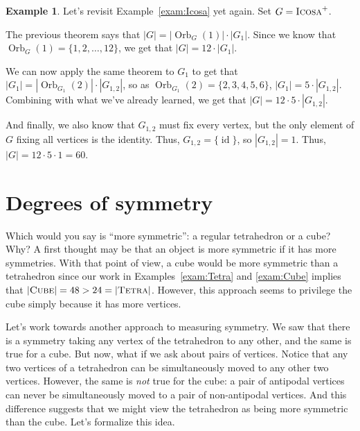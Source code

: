 \documentclass[11pt]{amsart}
\theoremstyle{plain}
\theoremstyle{definition}
\newtheorem{example}{Example}
\theoremstyle{remark}
\newcommand{\symtetra}{\textsc{Tetra}}
\newcommand{\symcube}{\textsc{Cube}}
\newcommand{\rsymicosa}{\textsc{Icosa}^+}
\DeclareMathOperator{\id}{id}
\DeclareMathOperator{\Orb}{Orb}
\begin{document}
\begin{example}
Let's revisit Example~\ref{exam:Icosa} yet again. Set $G = \rsymicosa$. 

The previous theorem says that $|G| = |\Orb_G(1)|\cdot |G_1|$. Since we know that $\Orb_G(1) = \{1,2,\dots, 12\}$, we get that $|G| = 12\cdot |G_1|$. 

We can now apply the same theorem to $G_1$ to get that $|G_1| = |\Orb_{G_1}(2)|\cdot |G_{1,2}|$, so as $\Orb_{G_1}(2) = \{2,3,4,5,6\}$, $|G_1| = 5\cdot |G_{1,2}|$. Combining with what we've already learned, we get that $|G| = 12\cdot 5 \cdot |G_{1,2}|$.

And finally, we also know that $G_{1,2}$ must fix every vertex, but the only element of $G$ fixing all vertices is the identity. Thus, $G_{1,2} = \{\id\}$, so $|G_{1,2}| = 1$. Thus,  $|G| = 12\cdot 5 \cdot 1 = 60$.
\end{example}

\section{Degrees of symmetry}\label{S:multipletrans}

Which would you say is ``more symmetric'': a regular tetrahedron or a cube? Why? 
A first thought may be that an object is more symmetric if it has more symmetries. With that point of view, a cube would be more symmetric than a tetrahedron since our work in Examples~\ref{exam:Tetra} and \ref{exam:Cube} implies that $|\symcube| = 48 > 24 = |\symtetra|$. However, this approach seems to privilege the cube simply because it has more vertices. 

Let's work towards another approach to measuring symmetry. We saw that there is a symmetry taking any vertex of the tetrahedron to any other, and the same is true for a cube. %
But now, what if we ask about pairs of vertices. Notice that any two vertices of a tetrahedron can be simultaneously moved to any other two vertices. However, the same is \emph{not} true for the cube: a pair of antipodal vertices can never be simultaneously moved to a pair of non-antipodal vertices. And this difference suggests that we might view the tetrahedron as being more symmetric than the cube. Let's formalize this idea.
\end{document}
